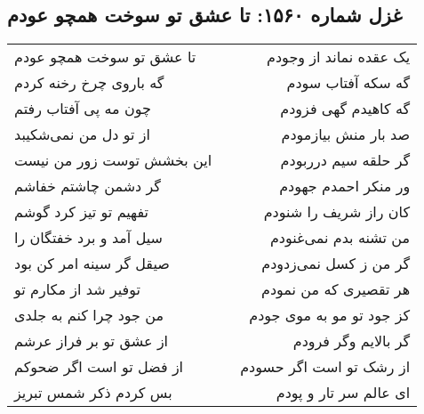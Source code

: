 \begin{center}
\section*{غزل شماره ۱۵۶۰: تا عشق تو سوخت همچو عودم}
\label{sec:1560}
\begin{longtable}{l p{0.5cm} r}
تا عشق تو سوخت همچو عودم
&&
یک عقده نماند از وجودم
\\
گه باروی چرخ رخنه کردم
&&
گه سکه آفتاب سودم
\\
چون مه پی آفتاب رفتم
&&
گه کاهیدم گهی فزودم
\\
از تو دل من نمی‌شکیبد
&&
صد بار منش بیازمودم
\\
این بخشش توست زور من نیست
&&
گر حلقه سیم درربودم
\\
گر دشمن چاشتم خفاشم
&&
ور منکر احمدم جهودم
\\
تفهیم تو تیز کرد گوشم
&&
کان راز شریف را شنودم
\\
سیل آمد و برد خفتگان را
&&
من تشنه بدم نمی‌غنودم
\\
صیقل گر سینه امر کن بود
&&
گر من ز کسل نمی‌زدودم
\\
توفیر شد از مکارم تو
&&
هر تقصیری که من نمودم
\\
من جود چرا کنم به جلدی
&&
کز جود تو مو به موی جودم
\\
از عشق تو بر فراز عرشم
&&
گر بالایم وگر فرودم
\\
از فضل تو است اگر ضحوکم
&&
از رشک تو است اگر حسودم
\\
بس کردم ذکر شمس تبریز
&&
ای عالم سر تار و پودم
\\
\end{longtable}
\end{center}
